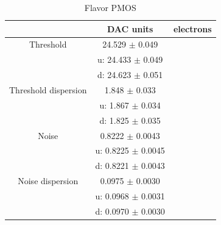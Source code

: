         \begin{table}
                \begin{center}
                \begin{tabular}{| c | c | c |}
                \hline
                 & DAC units & electrons \\
                \hline
                \hline
                Threshold        & 24.529 $\pm$ 0.049 & \\
                                 &u: 24.433 $\pm$ 0.049 & \\ 
                                 &d: 24.623 $\pm$ 0.051 &    \\      
                Threshold dispersion & 1.848 $\pm$ 0.033 &\\
                                 &u: 1.867 $\pm$ 0.034 & \\ 
                                 &d: 1.825 $\pm$ 0.035 &    \\ 
                Noise            & 0.8222 $\pm$ 0.0043 & \\
                                 &u: 0.8225 $\pm$ 0.0045 & \\ 
                                 &d: 0.8221 $\pm$ 0.0043 &    \\      
                Noise dispersion & 0.0975 $\pm$ 0.0030 &\\
                                 &u: 0.0968 $\pm$ 0.0031 & \\ 
                                 &d: 0.0970 $\pm$ 0.0030 &    \\ 
                \hline
                \end{tabular}
                \caption{Flavor PMOS}
                \label{tab:}
                \end{center}
        \end{table}        
    
